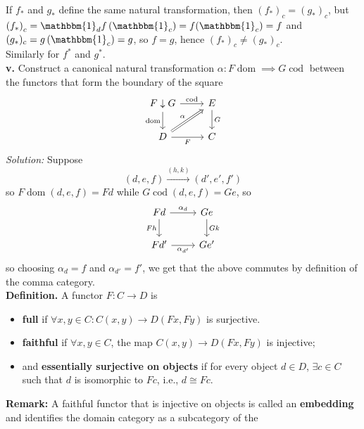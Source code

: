 \documentclass[a4paper]{article}
\theoremstyle{plain}%
\theoremstyle{definition}
\theoremstyle{remark}
\DeclareMathOperator{\dom}{dom}
\DeclareMathOperator{\cod}{cod}
\begin{document}
If $f_*$ and $g_*$ define the same natural transformation, then
$(f_*)_{c} = \left( g_* \right)_c$, but
$\left( f_* \right)_{c} =
\mathbbm{1}_d f \left( \mathbbm{1}_c \right) 
= f(\mathbbm{1}_c) = f$ and
$(g_*)_c = g \left( \mathbbm{1}_c \right) = g $, so
$f = g$, hence $(f_*)_{c} \neq \left( g_* \right)_{c}$.\\
Similarly for $f^{*}$ and $g^{*}$.\\
\linebreak
\textbf{v.} Construct a canonical natural transformation $\alpha
 \colon F \dom \implies G \cod$ between the functors that form the boundary
 of the square
 \begin{equation*}
 \begin{tikzcd}
     F\downarrow G \ar[r, "\cod"] \ar[d, "\dom"'] & E \ar[d, "G"]\\
     D \ar[r, "F"'] \ar[ru, Rightarrow, "\alpha"] & C
 \end{tikzcd}
 \end{equation*}
 \textit{Solution:} 
 Suppose 
  \[
      (d,e,f) \stackrel{\left( h,k \right) }{\to } \left( d',e',f' \right) 
 \] 
so
$F \dom \left( d, e,f \right) 
= Fd$ while
$G \cod \left( d, e,f \right) 
= Ge$, so 
\begin{equation*}
\begin{tikzcd}
    Fd \ar[r, "\alpha_d"] \ar[d, "F h"'] & Ge \ar[d, "G k"]\\
    Fd' \ar[r, "\alpha_{d'}"'] & Ge'
\end{tikzcd}
\end{equation*}
so choosing $\alpha_d = f$ and $\alpha_{d'} = f'$, we get
that the above commutes by definition of the comma category.\\
\linebreak
\textbf{Definition.} A functor $F  \colon C \to D$ is
\begin{itemize}
    \item \textbf{full} if $\forall x,y \in C \colon C(x,y) \to D(Fx, Fy)$ is
        surjective.
    \item \textbf{faithful} if $\forall x,y \in C$, the map
        $C(x,y) \to D(Fx, Fy)$ is injective;
    \item and \textbf{essentially surjective on objects} if for every object $d
        \in D$, $\exists c \in C$ such that $d$ is isomorphic to $Fc$, i.e.,
        $d \cong Fc$.
\end{itemize}
\textbf{Remark:} A faithful functor that is injective on objects is called an
\textbf{embedding} and identifies the domain category as a subcategory of the
\end{document}
